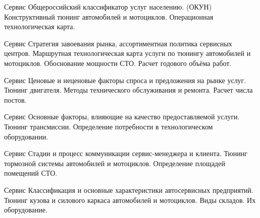 \documentclass[
	11pt,
	a4paper,
	]
	{article}
\begin{document}
\begin{minipage}[t][\miniH]{\miniL}\centering
	 {Сервис}
		{
			Общероссийский классификатор услуг населению. (ОКУН)
		}{
			Конструктивный тюнинг автомобилей и мотоциклов.
		}{
			Операционная технологическая карта.
		}
	\lowGE
\end{minipage}

\vfill



\begin{minipage}[t][\miniH]{\miniL}\centering
	 {Сервис}
		{
			Стратегия завоевания рынка, ассортиментная политика сервисных центров.
		}{
			Маршрутная технологическая карта услуги по тюнингу автомобилей и мотоциклов.
		}{
			Обоснование мощности СТО. Расчет годового объёма работ.
		}
	\lowGE
\end{minipage}

\vfill



\begin{minipage}[t][\miniH]{\miniL}\centering
	 {Сервис}
		{
			Ценовые и неценовые факторы спроса и предложения на рынке услуг.
		}{
			Тюнинг двигателя.
		}{
			Методы технического обслуживания и ремонта. Расчет числа постов.
		}
	\lowGE
\end{minipage}





\begin{minipage}[t][\miniH]{\miniL}\centering
	 {Сервис}
		{
			Основные факторы, влияющие на качество предоставляемой услуги.
		}{
			Тюнинг трансмиссии.
		}{
			Определение потребности в технологическом оборудовании.
		}
	\lowGE
\end{minipage}

\vfill



\begin{minipage}[t][\miniH]{\miniL}\centering
	 {Сервис}
		{
			Стадии и процесс коммуникации сервис-менеджера и клиента.
		}{
			Тюнинг тормозной системы автомобилей и мотоциклов.
		}{
			Определение площадей помещений СТО.
		}
	\lowGE
\end{minipage}

\vfill



\begin{minipage}[t][\miniH]{\miniL}\centering
	 {Сервис}
		{
			Классификация и основные характеристики автосервисных предприятий.
		}{
			Тюнинг кузова и силового каркаса автомобилей и мотоциклов.
		}{
			Виды складов. Их оборудование.
		}
	\lowGE
\end{minipage}
\end{document}
